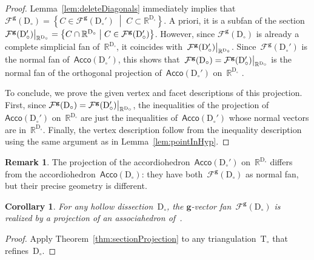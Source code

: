 \documentclass{amsart}
\newtheorem{corollary}[theorem]{Corollary}
\theoremstyle{definition}
\newtheorem{remark}[theorem]{Remark}
\newcommand{\R}{\mathbb{R}} %
\renewcommand{\b}[1]{\mathbf{#1}} %
\newcommand{\set}[2]{\left\{ #1 \;\middle|\; #2 \right\}} %
\newcommand{\Acco}{\mathsf{Acco}} %
\newcommand{\triangulation}{\mathrm{T}} %
\newcommand{\dissection}{\mathrm{D}} %
\newcommand{\gvectorFan}{\mathcal{F}^\mathbf{g}} %
\renewcommand{\restriction}[2]{\left.\kern-\nulldelimiterspace #1 \vphantom{\big|} \right|_{#2}}
\begin{document}
\begin{proof}
Lemma~\ref{lem:deleteDiagonals} immediately implies that~$\gvectorFan(\dissection_\circ) = \set{C \in \gvectorFan(\dissection_\circ')}{C \subset \R^{\dissection_\circ}}$. A priori, it is a subfan of the section $\restriction{\gvectorFan(\dissection_\circ')}{\R^{\dissection_\circ}} = \set{C \cap \R^{\dissection_\circ}}{C \in \gvectorFan(\dissection_\circ')}$. However, since $\gvectorFan(\dissection_\circ)$ is already a complete simplicial fan of~$\R^{\dissection_\circ}$, it coincides with~$\restriction{\gvectorFan(\dissection_\circ')}{\R^{\dissection_\circ}}$. Since~$\gvectorFan(\dissection_\circ')$ is the normal fan of~$\Acco(\dissection_\circ')$, this shows that~$\gvectorFan(\dissection_\circ) = \restriction{\gvectorFan(\dissection_\circ')}{\R^{\dissection_\circ}}$ is the normal fan of the orthogonal projection of~$\Acco(\dissection_\circ')$ on~$\R^{\dissection_\circ}$ \cite[Lemma~7.11]{Ziegler-polytopes}.

To conclude, we prove the given vertex and facet descriptions of this projection. First, since $\gvectorFan(\dissection_\circ) = \restriction{\gvectorFan(\dissection_\circ')}{\R^{\dissection_\circ}}$, the inequalities of the projection of~$\Acco(\dissection_\circ')$ on~$\R^{\dissection_\circ}$ are just the inequalities of~$\Acco(\dissection_\circ')$ whose normal vectors are in~$\R^{\dissection_\circ}$. Finally, the vertex description follow from the inequality description using the same argument as in Lemma~\ref{lem:pointInHyp}.
\end{proof}

\begin{remark}
The projection of the accordiohedron~$\Acco(\dissection_\circ')$ on~$\R^{\dissection_\circ}$ differs from the accordiohedron~$\Acco(\dissection_\circ)$: they have both~$\gvectorFan(\dissection_\circ)$ as normal fan, but their precise geometry is different.%
\end{remark}

\begin{corollary}
\label{coro:projectionAssociahedron}
For any hollow dissection~$\dissection_\circ$, the $\b{g}$-vector fan~$\gvectorFan(\dissection_\circ)$ is realized by a projection of an associahedron of~\cite{HohlwegPilaudStella}.
\end{corollary}

\begin{proof}
Apply Theorem~\ref{thm:sectionProjection} to any triangulation~$\triangulation_\circ$ that refines~$\dissection_\circ$.
\end{proof}
\end{document}
